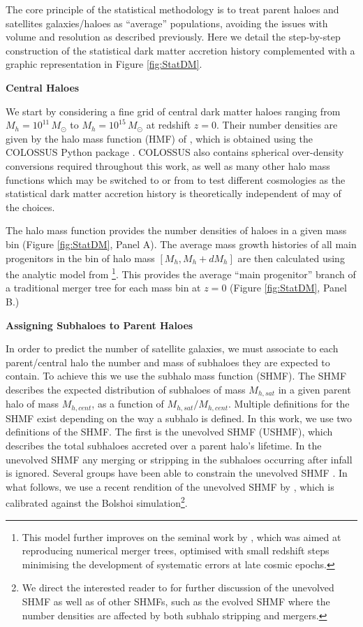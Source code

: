 The core principle of the statistical methodology is to treat parent haloes and satellites galaxies/haloes as ``average'' populations, avoiding the issues with volume and resolution as described previously. Here we detail the step-by-step construction of the statistical dark matter accretion history complemented with a graphic representation in Figure \ref{fig:StatDM}.

\textbf{Central Haloes}

We start by considering a fine grid of central dark matter haloes ranging from $M_{h}=10^{11}\, M_{\odot}$ to $M_{h}=10^{15}\, M_{\odot}$ at redshift $z=0$. Their number densities are given by the halo mass function (HMF) of \citet{Despali2016TheDefinitions}, which is obtained using the COLOSSUS Python package \citep{Diemer2018COLOSSUS:Halos}. COLOSSUS also contains spherical over-density conversions required throughout this work, as well as many other halo mass functions which may be switched to or from to test different cosmologies as the statistical dark matter accretion history is theoretically independent of may of the choices.

The halo mass function provides the number densities of haloes in a given mass bin (Figure \ref{fig:StatDM}, Panel A).
The average mass growth histories of all main progenitors in the bin of halo mass $[M_{h},M_{h}+dM_{h}]$ are then calculated using the analytic model from \citet{vandenBosch2014ComingWells}\footnote{This model further improves on the seminal work by \citet{Parkinson2008GeneratingTrees}, which was aimed at reproducing numerical merger trees, optimised with small redshift steps minimising the development of systematic errors at late cosmic epochs.}. This provides the average ``main progenitor'' branch of a traditional merger tree for each mass bin at $z = 0$ (Figure \ref{fig:StatDM}, Panel B.)

\textbf{Assigning Subhaloes to Parent Haloes}

In order to predict the number of satellite galaxies, we must associate to each parent/central halo the number and mass of subhaloes they are expected to contain. To achieve this we use the subhalo mass function (SHMF). The SHMF describes the expected distribution of subhaloes of mass $M_{h,sat}$ in a given parent halo of mass $M_{h,cent}$, as a function of $M_{h,sat}/M_{h,cent}$. Multiple definitions for the SHMF exist depending on the way a subhalo is defined. In this work, we use two definitions of the SHMF. The first is the unevolved SHMF (USHMF), which describes the total subhaloes accreted over a parent halo's lifetime. In the unevolved SHMF any merging or stripping in the subhaloes occurring after infall is ignored. Several groups have been able to constrain the unevolved SHMF \citep{Giocoli2008AnalyticalHaloes,Jiang2016StatisticsFunctions}. In what follows, we use a recent rendition of the unevolved SHMF by \citet{Jiang2016StatisticsFunctions}, which is calibrated against the Bolshoi simulation\footnote{We direct the interested reader to \citet{Jiang2016StatisticsFunctions} for further discussion of the unevolved SHMF as well as of other SHMFs, such as the evolved SHMF where the number densities are affected by both subhalo stripping and mergers.}.

